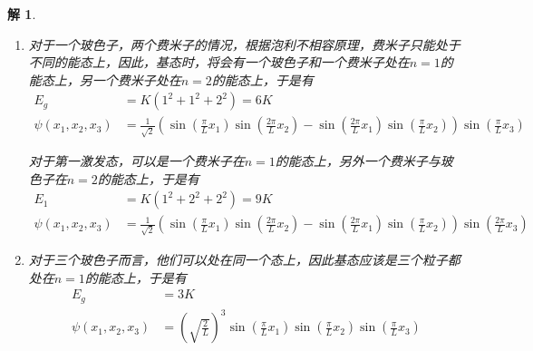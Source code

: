 \documentclass{article}
\newtheorem{solution}{解}
\begin{document}
\begin{solution}
\begin{enumerate}
        对于第一激发态，其能量为$6K$,是三重简并的，因此我们可以写出波函数
        \begin{align*}
            \psi(x_1,x_2,x_3)=\frac{1}{\sqrt{3}}&\left(\left(\sqrt{\frac{2}{L}}\right)^3\sin(\frac{\pi}{L}x_1)\sin(\frac{\pi}{L}x_2)\sin(\frac{2\pi}{L}x_3)\right.\\
            &+\left(\sqrt{\frac{2}{L}}\right)^3\sin(\frac{\pi}{L}x_1)\sin(\frac{2\pi}{L}x_2)\sin(\frac{\pi}{L}x_3)\\
            &\left.+\left(\sqrt{\frac{2}{L}}\right)^3\sin(\frac{2\pi}{L}x_1)\sin(\frac{\pi}{L}x_2)\sin(\frac{\pi}{L}x_3)\right)
        \end{align*}
        \item 对于一个玻色子，两个费米子的情况，根据泡利不相容原理，费米子只能处于不同的能态上，因此，基态时，将会有一个玻色子和一个费米子处在$n=1$的能态上，另一个费米子处在$n=2$的能态上，于是有
        \begin{align*}
            E_g&=K(1^2+1^2+2^2)=6K\\
            \psi(x_1,x_2,x_3)&=\frac{1}{\sqrt{2}}\left(\sin(\frac{\pi}{L}x_1)\sin(\frac{2\pi}{L}x_2)-\sin(\frac{2\pi}{L}x_1)\sin(\frac{\pi}{L}x_2)\right)\sin(\frac{\pi}{L}x_3)
        \end{align*}

        对于第一激发态，可以是一个费米子在$n=1$的能态上，另外一个费米子与玻色子在$n=2$的能态上，于是有
        \begin{align*}
            E_1&=K(1^2+2^2+2^2)=9K\\
            \psi(x_1,x_2,x_3)&=\frac{1}{\sqrt{2}}\left(\sin(\frac{\pi}{L}x_1)\sin(\frac{2\pi}{L}x_2)-\sin(\frac{2\pi}{L}x_1)\sin(\frac{\pi}{L}x_2)\right)\sin(\frac{2\pi}{L}x_3)
        \end{align*}
        \item 对于三个玻色子而言，他们可以处在同一个态上，因此基态应该是三个粒子都处在$n=1$的能态上，于是有
        \begin{align*}
            E_g&=3K\\
            \psi(x_1,x_2,x_3)&=\left(\sqrt{\frac{2}{L}}\right)^3\sin(\frac{\pi}{L}x_1)\sin(\frac{\pi}{L}x_2)\sin(\frac{\pi}{L}x_3)
        \end{align*}


\end{enumerate}
\end{solution}
\end{document}
